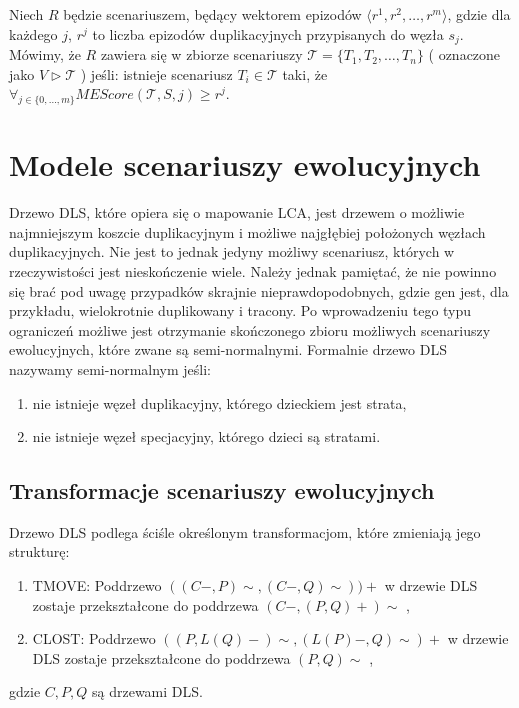 \documentclass[licencjacka]{pracamgr}
\begin{document}
Niech $R$ będzie scenariuszem, będący wektorem epizodów $\langle r^1,r^2, \dots , r^m \rangle$, gdzie dla każdego $j$, $r^j$ to liczba epizodów duplikacyjnych przypisanych do węzła $s_j$. Mówimy, że $R$ zawiera się w zbiorze scenariuszy $\mathcal{T}=\{T_1,T_2, \dots , T_n\}$ ( oznaczone jako $V \triangleright \mathcal{T}$ ) jeśli: istnieje scenariusz ${T_i \in \mathcal{T}}$ taki, że $\forall_{j \in \{0,\dots,m\}}MEScore(\mathcal{T},S,j) \geq r^j$.




\section{Modele scenariuszy ewolucyjnych}

Drzewo DLS, które opiera się o mapowanie LCA, jest drzewem o możliwie najmniejszym koszcie duplikacyjnym i możliwe najgłębiej położonych węzłach duplikacyjnych. Nie jest to jednak jedyny możliwy scenariusz, których w rzeczywistości jest nieskończenie wiele. Należy jednak pamiętać, że nie powinno się brać pod uwagę przypadków skrajnie nieprawdopodobnych, gdzie gen jest, dla przykładu, wielokrotnie duplikowany i tracony. Po wprowadzeniu tego typu ograniczeń możliwe jest otrzymanie skończonego zbioru możliwych scenariuszy ewolucyjnych, które zwane są semi-normalnymi. Formalnie drzewo DLS nazywamy semi-normalnym jeśli:
\begin{enumerate}
\item nie istnieje węzeł duplikacyjny, którego dzieckiem jest strata,
\item nie istnieje węzeł specjacyjny, którego dzieci są stratami.
\end{enumerate}


\subsection{Transformacje scenariuszy ewolucyjnych}

Drzewo DLS podlega ściśle określonym transformacjom, które zmieniają jego strukturę: 
\begin{enumerate}
\item TMOVE: Poddrzewo $((C-,P)\sim,(C-,Q)\sim))+$ w drzewie DLS zostaje przekształcone do poddrzewa $(C-,(P,Q)+)\sim $ ,
\item CLOST: Poddrzewo $((P,L(Q)-)\sim,(L(P)-,Q)\sim)+$ w drzewie DLS zostaje przekształcone do poddrzewa   $(P,Q)\sim $ ,
\end{enumerate}
gdzie $C,P,Q$ są drzewami DLS.
\end{document}
